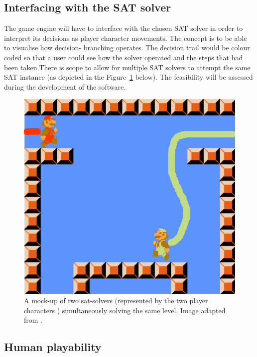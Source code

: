 \documentclass[11pt, a4paper, oneside]{report} %
\begin{document}
\subsection{Interfacing with the SAT solver}

The game engine will have to interface with the chosen SAT solver in order to interpret its
decisions as player character movements. The concept is to be able to visualise how decision-
branching operates. The decision trail would be colour coded so that a user could see how the solver operated and the steps that had been taken.There is scope to allow for multiple SAT solvers to attempt the same SAT
instance (as depicted in the Figure~\ref{model_project} below). The feasibility will be assessed during the development
of the software.

\begin{figure}[h!]
  
  \centering
    \includegraphics[scale=0.3]{running}
  \caption{A mock-up of two sat-solvers (represented by the two player characters
) simultaneously solving the same level. Image adapted from \cite{Aloupis2012}.}
  \label{model_project}
\end{figure}


\subsection{Human playability}
\end{document}
